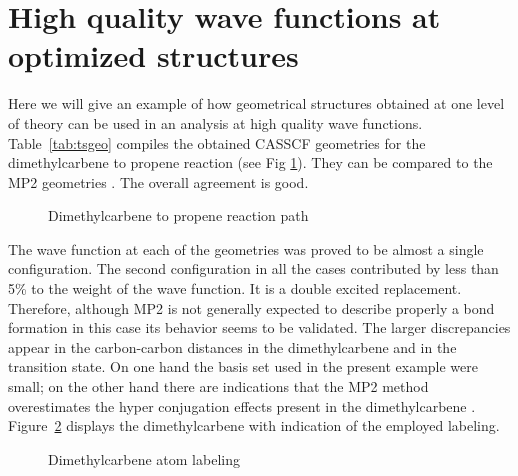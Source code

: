 \section{High quality wave functions at optimized structures}
\label{TUT:sec:rp_wf}
Here we will give an example of how geometrical structures obtained at
one level of theory can be used in an analysis at high quality wave functions.
Table~\ref{tab:tsgeo} compiles the obtained CASSCF geometries for 
the dimethylcarbene to propene reaction (see Fig \ref{fig:reaction}).
They can be compared to the MP2 geometries \cite{Ford:97}. 
The overall agreement is good. 

\begin{figure}[hp]
\caption{\label{fig:reaction}Dimethylcarbene to propene reaction path}
\end{figure}

The wave function at each of the geometries was
proved to be almost a single configuration. The second configuration in 
all the cases contributed by less than 5\% to the weight of the wave
function. It is a double excited replacement. Therefore, although
MP2 is not generally expected to describe properly a bond formation
in this case its behavior seems to be validated. The larger discrepancies
appear in the carbon-carbon distances in the dimethylcarbene and in
the transition state. On one hand the basis set used in the present
example were small; on the other hand there are indications that
the MP2 method overestimates the hyper conjugation effects present
in the dimethylcarbene \cite{Ford:97}. Figure~\ref{fig:carbene} displays
the dimethylcarbene with indication of the employed labeling.

\begin{figure}[htp]
\caption{\label{fig:carbene}Dimethylcarbene atom labeling}
\end{figure}

